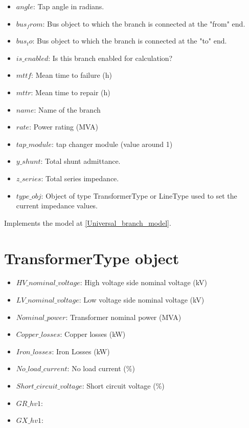 \documentclass[11pt,fleqn]{book} %
\begin{document}
\begin{itemize}
	\item $angle$: Tap angle in radians.
	\item $bus_from$: Bus object to which the branch is connected at the "from" end.
	\item $bus_to$: Bus object to which the branch is connected at the "to" end.
	\item $is\_enabled$: Is this branch enabled for calculation?
	\item $mttf$: Mean time to failure (h)
	\item $mttr$: Mean time to repair (h)
	\item $name$: Name of the branch
	\item $rate$: Power rating (MVA)
	\item $tap\_module$: tap changer module (value around 1)
	\item $y\_shunt$: Total shunt admittance.
	\item $z\_series$: Total series impedance.
	\item $type\_obj$: Object of type TransformerType or LineType used to set the current impedance values. \newline
\end{itemize}

Implements the model at \ref{Universal_branch_model}.



\section{TransformerType object}

\begin{itemize}
	\item $HV\_nominal\_voltage$: High voltage side nominal voltage (kV)
	\item $LV\_nominal\_voltage$: Low voltage side nominal voltage (kV)
	\item $Nominal\_power$: Transformer nominal power (MVA)
	\item $Copper\_losses$: Copper losses (kW)
	\item $Iron\_losses$: Iron Losses (kW)
	\item $No\_load\_current$: No load current (\%)
	\item $Short\_circuit\_voltage$: Short circuit voltage (\%)
	\item $GR\_hv1$:
	\item $GX\_hv1$:  \newline
\end{itemize}
\end{document}
